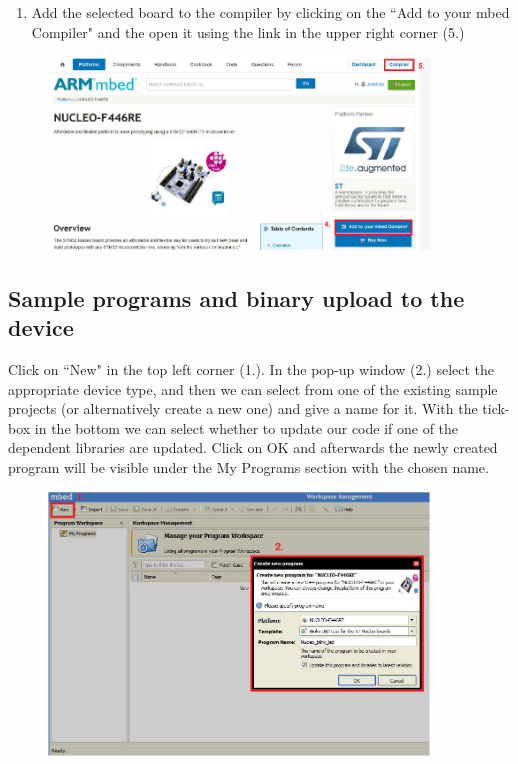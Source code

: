 \documentclass[a4paper]{article}
\begin{document}
\begin{enumerate}[resume]
\item Add the selected board to the compiler by clicking on the ``Add to your mbed Compiler" and the open it using the link in the upper right corner (5.)
\end{enumerate}
\begin{figure}[H]
    \centering
    \includegraphics[width=0.9\textwidth]{figures/mbed-compiler.png}
\end{figure}

\subsection{Sample programs and binary upload to the device}

Click on ``New" in the top left corner (1.). In the pop-up window (2.) select the appropriate device type, and then we can select from one of the existing sample projects (or alternatively create a new one) and give a name for it. With the tick-box in the bottom we can select whether to update our code if one of the dependent libraries are updated. Click on OK and afterwards the newly created program will be visible under the My Programs section with the chosen name.
\begin{figure}[H]
    \centering
    \includegraphics[width=0.9\textwidth]{figures/mbed-new.png}
\end{figure}
\end{document}
